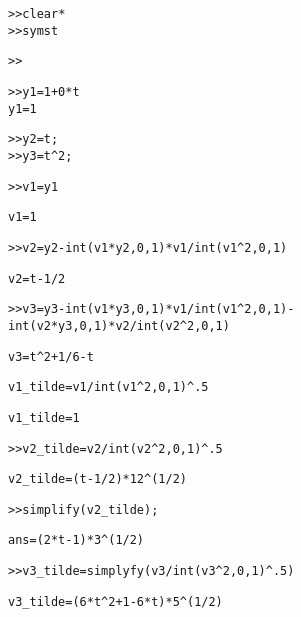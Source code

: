 \documentclass[11pt,twoside]{nsf_jwg}
\begin{document}
\begin{alltt}
>> clear *
>> syms t % declare to be a symbolic variable

>> % INT(S,a,b) is the definite integral of S with respect to
   % its symbolic variable from a to b.  a and b are each
   % double or symbolic scalars.

>> y1=1+0*t % Otherwise MATLAB is too dumb to realize
            % that y1 is a trivial function of the symbolic
            % variable t
y1 = 1

>> y2=t;
>> y3=t^2;

% Start the G-S Procedure. Here we assume C[0,1], that is
% C[a,b], with [a,b]=[0,1]

>> v1=y1

v1=1

>> v2=y2-int(v1*y2,0,1)*v1/int(v1^2,0,1)

v2=t-1/2

>> v3=y3-int(v1*y3,0,1)*v1/int(v1^2,0,1)-
int(v2*y3,0,1)*v2/int(v2^2,0,1)

v3=t^2+1/6-t

% Next, normalize to length one

v1_tilde=v1/int(v1^2,0,1)^.5

v1_tilde=1

>> v2_tilde=v2/int(v2^2,0,1)^.5

v2_tilde=(t-1/2)*12^(1/2)

>> simplify(v2_tilde);

ans=(2*t-1)*3^(1/2)

>> v3_tilde=simplyfy(v3/int(v3^2,0,1)^.5)

v3_tilde=(6*t^2+1-6*t)*5^(1/2)
\end{alltt}
\end{document}
